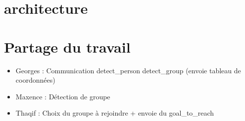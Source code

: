 \documentclass{report}
\begin{document}
\section{architecture}


\section{Partage du travail}

\begin{itemize}
\item Georges : Communication detect\_person detect\_group (envoie tableau
  de coordonn\'ees)
\item Maxence : D\'etection de groupe
  \item Thaqif : Choix du groupe \`a rejoindre + envoie du goal\_to\_reach
\end{itemize}
\end{document}

